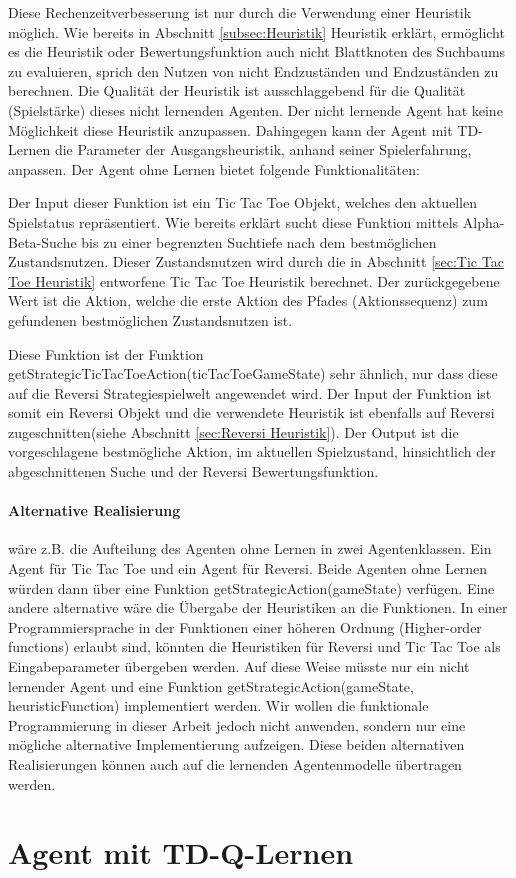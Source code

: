 Diese Rechenzeitverbesserung ist nur durch die Verwendung einer Heuristik möglich. Wie bereits in Abschnitt \ref{subsec:Heuristik} Heuristik erklärt, ermöglicht es die Heuristik oder Bewertungsfunktion auch nicht Blattknoten des Suchbaums zu evaluieren, sprich den Nutzen von nicht Endzuständen und Endzuständen zu berechnen. Die Qualität der Heuristik ist ausschlaggebend für die Qualität (Spielstärke) dieses nicht lernenden Agenten. Der nicht lernende Agent hat keine Möglichkeit diese Heuristik anzupassen. Dahingegen kann der Agent mit TD-Lernen die Parameter der Ausgangsheuristik, anhand seiner Spielerfahrung, anpassen. Der Agent ohne Lernen bietet folgende Funktionalitäten:

Der Input dieser Funktion ist ein Tic Tac Toe Objekt, welches den aktuellen Spielstatus repräsentiert. Wie bereits erklärt sucht diese Funktion mittels Alpha-Beta-Suche bis zu einer begrenzten Suchtiefe nach dem bestmöglichen Zustandsnutzen. Dieser Zustandsnutzen wird durch die in Abschnitt \ref{sec:Tic Tac Toe Heuristik} entworfene Tic Tac Toe Heuristik berechnet. Der zurückgegebene Wert ist die Aktion, welche die erste Aktion des Pfades (Aktionssequenz) zum gefundenen bestmöglichen Zustandsnutzen ist.  

Diese Funktion ist der Funktion getStrategicTicTacToeAction(ticTacToeGameState) sehr ähnlich, nur dass diese auf die Reversi Strategiespielwelt angewendet wird. Der Input der Funktion ist somit ein Reversi Objekt und die verwendete Heuristik ist ebenfalls auf Reversi zugeschnitten(siehe Abschnitt \ref{sec:Reversi Heuristik}). Der Output ist die vorgeschlagene bestmögliche Aktion, im aktuellen Spielzustand, hinsichtlich der abgeschnittenen Suche und der Reversi Bewertungsfunktion.

\paragraph{Alternative Realisierung} wäre z.B. die Aufteilung des Agenten ohne Lernen in zwei Agentenklassen. Ein Agent für Tic Tac Toe und ein Agent für Reversi. Beide Agenten ohne Lernen würden dann über eine Funktion getStrategicAction(gameState) verfügen. Eine andere alternative wäre die Übergabe der Heuristiken an die Funktionen. In einer Programmiersprache in der Funktionen einer höheren Ordnung (Higher-order functions) erlaubt sind, könnten die Heuristiken für Reversi und Tic Tac Toe als Eingabeparameter übergeben werden. Auf diese Weise müsste nur ein nicht lernender Agent und eine Funktion getStrategicAction(gameState, heuristicFunction) implementiert werden. Wir wollen die funktionale Programmierung in dieser Arbeit jedoch nicht anwenden, sondern nur eine mögliche alternative Implementierung aufzeigen. Diese beiden alternativen Realisierungen können auch auf die lernenden Agentenmodelle übertragen werden.

\section{Agent mit TD-Q-Lernen}


